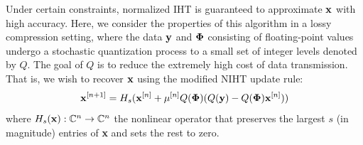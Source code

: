 \documentclass{article}
\begin{document}

Under certain constraints, normalized IHT is guaranteed to approximate ${\bf x}$ with high accuracy. Here, we consider the properties of this algorithm in a lossy compression setting, where the data ${\bf y}$ and ${\bf \Phi}$ consisting of floating-point values undergo a stochastic quantization process to a small set of integer levels denoted by $Q$. The goal of $Q$ is to reduce the extremely high cost of data transmission. That is, we wish to recover ${\bf x}$ using the  modified NIHT update rule:
 \begin{equation}
     {\bf x}^{[n+1]} = H_s({\bf x}^{[n]} + \mu^{[n]}Q({\bf \Phi})(Q({\bf y}) - Q({\bf \Phi}){\bf x}^{[n]}))
 \end{equation}
where $H_s({\bf x}): \mathbb{C}^n \rightarrow \mathbb{C}^n$ the nonlinear operator that preserves the largest $s$ (in magnitude) entries of {\bf x} and sets the rest to zero. 
 
     
\end{document}
